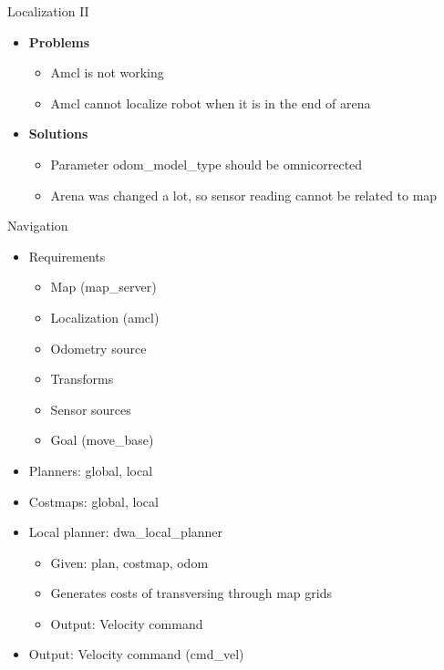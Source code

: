 \begin{frame}{Localization II}
\begin{itemize}
\item \textbf{Problems}
    \begin{itemize}
    \item Amcl is not working
    \item Amcl cannot localize robot when it is in the end of arena
    \end{itemize}
\item \textbf{Solutions}
	\begin{itemize}
	\item Parameter odom\_model\_type should be omni\-corrected
	\item Arena was changed a lot, so sensor reading cannot be related to map
	\end{itemize}
\end{itemize}
\end{frame}
\begin{frame}{Navigation}
\begin{itemize}
	\item Requirements
		\begin{itemize}
			\item Map (map\_server)
			\item Localization (amcl)
			\item Odometry source
			\item Transforms
			\item Sensor sources
			\item Goal (move\_base) 
		\end{itemize}
	\item Planners: global, local
	\item Costmaps: global, local
	\item Local planner: dwa\_local\_planner
		\begin{itemize}
			\item Given: plan, costmap, odom
			\item Generates costs of transversing through map grids
			\item Output: Velocity command
		\end{itemize} 
	\item Output: Velocity command (cmd\_vel)
\end{itemize}
\end{frame}
